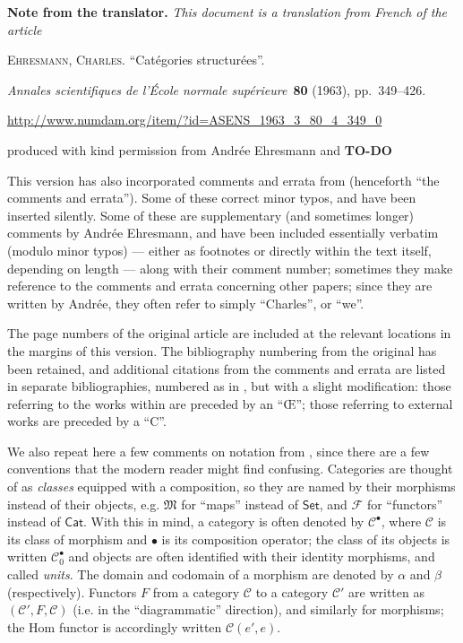 \documentclass[a4paper,fleqn]{article}
\title{\sc{Structured categories}}
\author{Charles Ehresmann}
\date{1963}
\newcommand{\origcit}{%
  \textsc{Ehresmann, Charles.}
  ``Catégories structurées''.
  \par\emph{Annales scientifiques de l'École normale supérieure}~\textbf{80} (1963), pp.~349--426.
  \par\url{http://www.numdam.org/item/?id=ASENS_1963_3_80_4_349_0}
}
\newenvironment{translator}[1]
  {\phantomsection\par\medskip\noindent\small\textbf{#1.}\itshape}
  {\par\medskip}
\theoremstyle{plain}
\theoremstyle{definition}
\newcommand{\todo}{{\color{purple}\textbf{TO-DO }}}
\newcommand{\CC}{\mathcal{C}}
\newcommand{\MM}{\mathfrak{M}}
\newcommand{\FF}{\mathcal{F}}
\begin{document}
\maketitle

  \begin{translator}{Note from the translator}
    This document is a translation from French of the article

    \medskip
    {\normalfont\origcit}

    \medskip
    {\noindent}produced with kind permission from Andrée Ehresmann and \todo

    \medskip

    This version has also incorporated comments and errata from \cite[Comments on Part III-1, p.~342--363]{coll} (henceforth ``the comments and errata'').
    Some of these correct minor typos, and have been inserted silently.
    Some of these are supplementary (and sometimes longer) comments by Andrée Ehresmann, and have been included essentially verbatim (modulo minor typos) --- either as footnotes or directly within the text itself, depending on length --- along with their comment number;
    sometimes they make reference to the comments and errata concerning other papers;
    since they are written by Andrée, they often refer to simply ``Charles'', or ``we''.

    The page numbers of the original article are included at the relevant locations in the margins of this version.
    The bibliography numbering from the original has been retained, and additional citations from the comments and errata are listed in separate bibliographies, numbered as in \cite{coll}, but with a slight modification: those referring to the works within \cite{coll} are preceded by an ``Œ''; those referring to external works are preceded by a ``C''.

    \medskip

    We also repeat here a few comments on notation from \cite[Comments on Part III-1, p.~337--338]{coll}, since there are a few conventions that the modern reader might find confusing.
    Categories are thought of as \emph{classes} equipped with a composition, so they are named by their morphisms instead of their objects, e.g. $\MM$ for ``maps'' instead of $\mathsf{Set}$, and $\FF$ for ``functors'' instead of $\mathsf{Cat}$.
    With this in mind, a category is often denoted by $\CC^\bullet$, where $\CC$ is its class of morphism and $\bullet$ is its composition operator; the class of its objects is written $\CC_0^\bullet$ and objects are often identified with their identity morphisms, and called \emph{units}.
    The domain and codomain of a morphism are denoted by $\alpha$ and $\beta$ (respectively).
    Functors $F$ from a category $\CC$ to a category $\CC'$ are written as $(\CC',F,\CC)$ (i.e. in the ``diagrammatic'' direction), and similarly for morphisms; the Hom functor is accordingly written $\CC(e',e)$.


\end{translator}
\end{document}
